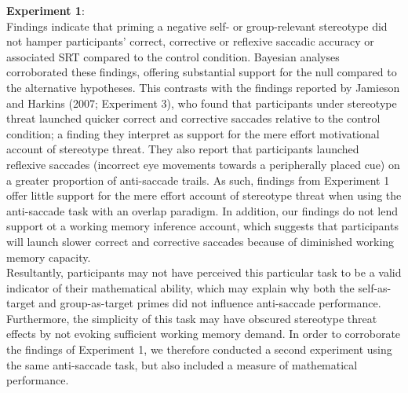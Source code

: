 \documentclass[
  doc, a4paper]{apa7}
\begin{document}
\textbf{Experiment 1}:\\
Findings indicate that priming a negative self- or group-relevant stereotype did not hamper participants' correct, corrective or reflexive saccadic accuracy or associated SRT compared to the control condition. Bayesian analyses corroborated these findings, offering substantial support for the null compared to the alternative hypotheses. This contrasts with the findings reported by Jamieson and Harkins (2007; Experiment 3), who found that participants under stereotype threat launched quicker correct and corrective saccades relative to the control condition; a finding they interpret as support for the mere effort motivational account of stereotype threat. They also report that participants launched reflexive saccades (incorrect eye movements towards a peripherally placed cue) on a greater proportion of anti-saccade trails. As such, findings from Experiment 1 offer little support for the mere effort account of stereotype threat when using the anti-saccade task with an overlap paradigm. In addition, our findings do not lend support ot a working memory inference account, which suggests that participants will launch slower correct and corrective saccades because of diminished working memory capacity.\\
Resultantly, participants may not have perceived this particular task to be a valid indicator of their mathematical ability, which may explain why both the self-as-target and group-as-target primes did not influence anti-saccade performance. Furthermore, the simplicity of this task may have obscured stereotype threat effects by not evoking sufficient working memory demand. In order to corroborate the findings of Experiment 1, we therefore conducted a second experiment using the same anti-saccade task, but also included a measure of mathematical performance.
\end{document}
